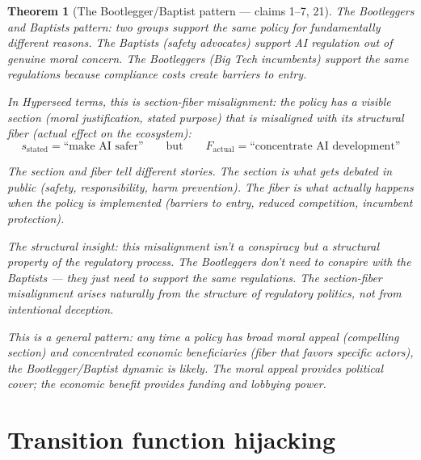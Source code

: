 \documentclass[11pt,a4paper]{article}
\newtheorem{theorem}[definition]{Theorem}
\begin{document}
\begin{theorem}[The Bootlegger/Baptist pattern --- claims 1--7, 21]
\label{thm:misalignment}
The Bootleggers and Baptists pattern: two groups support the same
policy for fundamentally different reasons. The Baptists (safety
advocates) support AI regulation out of genuine moral concern. The
Bootleggers (Big Tech incumbents) support the same regulations because
compliance costs create barriers to entry.

In Hyperseed terms, this is \emph{section-fiber misalignment}: the
policy has a visible section (moral justification, stated purpose)
that is misaligned with its structural fiber (actual effect on the
ecosystem):
\[
  s_{\text{stated}} = \text{``make AI safer''} \qquad \text{but} \qquad
  F_{\text{actual}} = \text{``concentrate AI development''}
\]

The section and fiber tell different stories. The section is what
gets debated in public (safety, responsibility, harm prevention).
The fiber is what actually happens when the policy is implemented
(barriers to entry, reduced competition, incumbent protection).

The structural insight: this misalignment isn't a conspiracy but a
\emph{structural property} of the regulatory process. The Bootleggers
don't need to conspire with the Baptists --- they just need to support
the same regulations. The section-fiber misalignment arises naturally
from the structure of regulatory politics, not from intentional
deception.

This is a general pattern: any time a policy has broad moral appeal
(compelling section) and concentrated economic beneficiaries (fiber
that favors specific actors), the Bootlegger/Baptist dynamic is
likely. The moral appeal provides political cover; the economic
benefit provides funding and lobbying power.
\end{theorem}


\section{Transition function hijacking}
\label{sec:capture}
\end{document}
